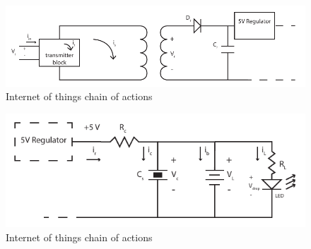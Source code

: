 

\begin{figure}[h!]
\centering
\includegraphics[width=1\textwidth]{design.pdf}
\caption{Internet of things chain of actions}
\label{fig:design1}
\end{figure}

\begin{figure}[h!]
\centering
\includegraphics[width=1\textwidth]{rec_design.pdf}
\caption{Internet of things chain of actions}
\label{fig:rec_des}
\end{figure}

